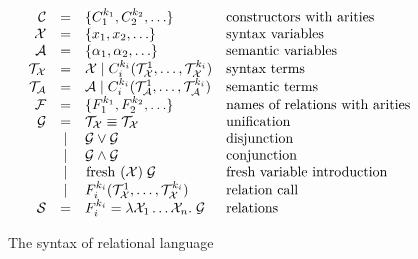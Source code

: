 \begin{figure}[h]
\[
  \begin{array}{rcll}
     \mathcal{C} & = & \{ C_1^{k_1}, C_2^{k_2}, \ldots \} 
     & \mbox{constructors with arities} 
     \\
     \mathcal{X} & = & \{x_1, x_2, \ldots \} 
     & \mbox{syntax variables} 
     \\
     \mathcal{A} & = & \{\alpha_1, \alpha_2, \ldots \} 
     & \mbox{semantic variables} 
     \\
     \mathcal{T}_\mathcal{X} & = & \mathcal{X} \mid C_i^{k_i}(\mathcal{T}_\mathcal{X}^1, \ldots, \mathcal{T}_\mathcal{X}^{k_i})
     & \mbox{syntax terms} 
     \\
     \mathcal{T}_\mathcal{A} & = & \mathcal{A} \mid C_i^{k_i}(\mathcal{T}_\mathcal{A}^1, \ldots, \mathcal{T}_\mathcal{A}^{k_i})
     & \mbox{semantic terms} 
     \\
     \mathcal{F} & = & \{F_1^{k_1}, F_2^{k_2}, \ldots \} 
     & \mbox{names of relations with arities} 
     \\
     \mathcal{G} & =    & \mathcal{T}_\mathcal{X} \equiv \mathcal{T}_\mathcal{X} & \mbox{unification} \\
                 & \mid & \mathcal{G} \lor \mathcal{G} & \mbox{disjunction} \\
                 & \mid & \mathcal{G} \land \mathcal{G} & \mbox{conjunction} \\
                 & \mid & \mbox{\lstinline|fresh|} \; (\mathcal{X}) \; \mathcal{G} & \mbox{fresh variable introduction} \\
                 & \mid &  F_i^{k_i}(\mathcal{T}_\mathcal{X}^1, \ldots, \mathcal{T}_\mathcal{X}^{k_i}) & \mbox{relation call} \\
    \mathcal{S} & = &F_i^{k_i} = \lambda \mathcal{X}_1 \ldots \mathcal{X}_n. \; \mathcal{G} & \mbox{relations}
  \end{array}
\]
    \caption{The syntax of relational language}
    \label{fair:syntax}
\end{figure}


